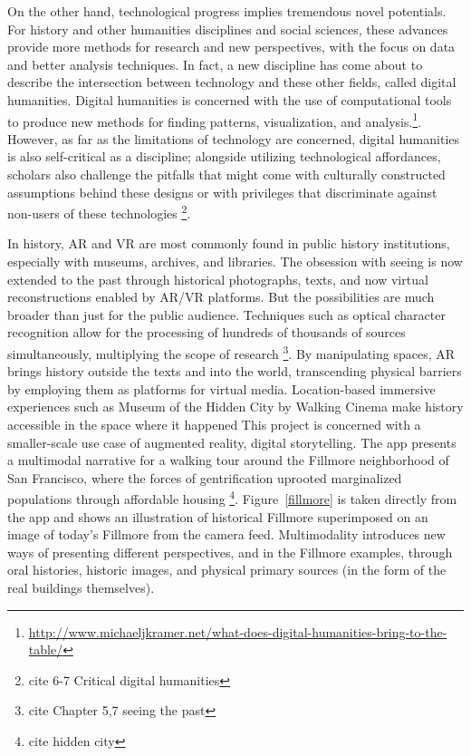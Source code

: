 On the other hand, technological progress implies tremendous novel potentials. For history and other humanities disciplines and social sciences, these advances provide more methods for research and new perspectives, with the focus on data and better analysis techniques. In fact, a new discipline has come about to describe the intersection between technology and these other fields, called digital humanities. Digital humanities is concerned with the use of computational tools to produce new methods for finding patterns, visualization, and analysis.\footnote{\url{http://www.michaeljkramer.net/what-does-digital-humanities-bring-to-the-table/}}. However, as far as the limitations of technology are concerned, digital humanities is also self-critical as a discipline; alongside utilizing technological affordances, scholars also challenge the pitfalls that might come with culturally constructed assumptions behind these designs or with privileges that discriminate against non-users of these technologies \footnote{cite 6-7 Critical digital humanities}.

In history, AR and VR are most commonly found in public history institutions, especially with museums, archives, and libraries. The obsession with seeing is now extended to the past through historical photographs, texts, and now virtual reconstructions enabled by AR/VR platforms. But the possibilities are much broader than just for the public audience. Techniques such as optical character recognition allow for the processing of hundreds of thousands of sources simultaneously, multiplying the scope of research \footnote{cite Chapter 5,7 seeing the past}. By manipulating spaces, AR brings history outside the texts and into the world, transcending physical barriers by employing them as platforms for virtual media. Location-based immersive experiences such as Museum of the Hidden City by Walking Cinema make history accessible in the space where it happened
This project is concerned with a smaller-scale use case of augmented reality, digital storytelling. The app presents a multimodal narrative for a walking tour around the Fillmore neighborhood of San Francisco, where the forces of gentrification uprooted marginalized populations through affordable housing \footnote{cite hidden city}. Figure~\ref{fillmore} is taken directly from the app and shows an illustration of historical Fillmore superimposed on an image of today's Fillmore from the camera feed. Multimodality introduces new ways of presenting different perspectives, and in the Fillmore examples, through oral histories, historic images, and physical primary sources (in the form of the real buildings themselves).

